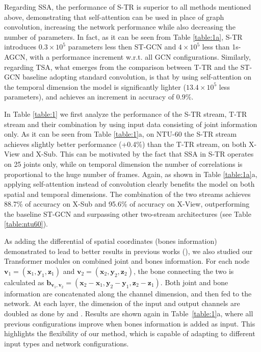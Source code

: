 \documentclass[times,twocolumn,final,authoryear]{elsarticle}
\begin{document}
Regarding SSA, the performance of S-TR is superior to all methods mentioned above, demonstrating that self-attention can be used in place of graph convolution, increasing the network performance while also decreasing the number of parameters. 
In fact, as it can be seen from Table \ref{table:1a}, S-TR introduces $0.3\times10^5$ parameters less then ST-GCN and $4\times10^5$ less than 1s-AGCN, with a performance increment w.r.t. all GCN configurations. Similarly, regarding TSA, what emerges from the comparison between T-TR and the ST-GCN baseline adopting standard convolution, is that by using self-attention on the temporal dimension the model is significantly lighter ($13.4\times10^5$ less parameters), and achieves an increment in accuracy of $0.9\%$. 


In Table \ref{table:1} we first analyze the performance of the S-TR stream, T-TR stream and their combination by using input data consisting of joint information only. As it can be seen from Table \ref{table:1}a, on NTU-60 the S-TR stream achieves slightly better performance (+0.4\%) than the T-TR stream, on both X-View and X-Sub. This can be motivated by the fact that SSA in S-TR operates on 25 joints only, while on temporal dimension the number of correlations is proportional to the huge number of frames. Again, as shown in Table \ref{table:1a}a, applying self-attention instead of convolution clearly benefits the model on both spatial and temporal dimensions. The combination of the two streams achieves 88.7\% of accuracy on X-Sub and 95.6\% of accuracy on X-View,  outperforming the baseline ST-GCN and surpassing other two-stream architectures (see Table \ref{table:ntu60}).


As adding the differential of spatial coordinates (bones information) demonstrated to lead to better results in previous works (\cite{dirgraph,2s-cnn}), we also studied our Transformer modules on combined joint and bones information. For each node $\mathbf{v}_1=(\mathbf{x}_1, \mathbf{y}_1, \mathbf{z}_1)$ and $\mathbf{v}_2=(\mathbf{x}_2,\mathbf{y}_2,\mathbf{z}_2)$, the bone connecting the two is calculated as 
    $\mathbf{b}_{\mathbf{v}_1,\mathbf{v}_2}=(\mathbf{x}_2-\mathbf{x}_1,\mathbf{y}_2-\mathbf{y}_1,\mathbf{z}_2-\mathbf{z}_1)$.
Both joint and bone information are concatenated along the channel dimension, and then fed to the network. At each layer, the dimension of the input and output channels are doubled as done by \cite{dirgraph} and \cite{2s-cnn}. Results are shown again in Table~\ref{table:1}a, where all previous configurations improve when bones information is added as input. This highlights the flexibility of our method, which is capable of adapting to different input types and network configurations. 
\end{document}
